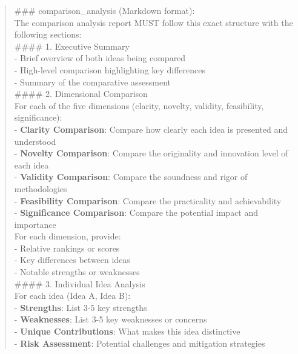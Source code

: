 \begin{quote}
\begin{tcolorbox}[breakable,colback=report!20!white, colframe=report!60!black, title=\textbf{Prompt for Report Agent (Pair Comparison)}]
        \#\#\# comparison\_analysis (Markdown format):\\
        The comparison analysis report MUST follow this exact structure with the following sections:\\
        
        \#\#\#\# 1. Executive Summary\\
        - Brief overview of both ideas being compared\\
        - High-level comparison highlighting key differences\\
        - Summary of the comparative assessment\\
        
        \#\#\#\# 2. Dimensional Comparison\\
        For each of the five dimensions (clarity, novelty, validity, feasibility, significance):\\
        - \textbf{Clarity Comparison}: Compare how clearly each idea is presented and understood\\
        - \textbf{Novelty Comparison}: Compare the originality and innovation level of each idea\\
        - \textbf{Validity Comparison}: Compare the soundness and rigor of methodologies\\
        - \textbf{Feasibility Comparison}: Compare the practicality and achievability\\
        - \textbf{Significance Comparison}: Compare the potential impact and importance\\
        
        For each dimension, provide:\\
        - Relative rankings or scores\\
        - Key differences between ideas\\
        - Notable strengths or weaknesses\\
        
        \#\#\#\# 3. Individual Idea Analysis\\
        For each idea (Idea A, Idea B):\\
        - \textbf{Strengths}: List 3-5 key strengths\\
        - \textbf{Weaknesses}: List 3-5 key weaknesses or concerns\\
        - \textbf{Unique Contributions}: What makes this idea distinctive\\
        - \textbf{Risk Assessment}: Potential challenges and mitigation strategies\\
        

\end{tcolorbox}
\end{quote}
